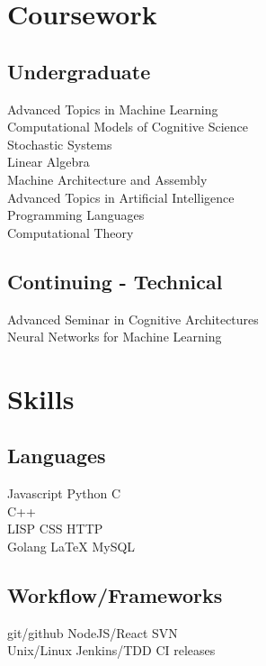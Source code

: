 \documentclass[]{csaund-resume}
\begin{document}
\begin{minipage}[t]{0.33\textwidth}
\section{Coursework}
\subsection{Undergraduate}
Advanced Topics in Machine Learning \\
Computational Models of Cognitive Science \\
Stochastic Systems \\
Linear Algebra \\
Machine Architecture and Assembly \\
Advanced Topics in Artificial Intelligence \\
Programming Languages \\
Computational Theory \\
\sectionsep

\subsection{Continuing - Technical}
Advanced Seminar in Cognitive Architectures \\
Neural Networks for Machine Learning \\


\section{Skills}
\subsection{Languages}
Javascript \textbullet{} Python \textbullet{} C \\
C++ \\
LISP \textbullet{} \textbullet{} CSS \textbullet{} HTTP \\
Golang \textbullet{} LaTeX \textbullet{} MySQL
\subsection{Workflow/Frameworks}
git/github \textbullet{} NodeJS/React \textbullet{} SVN \textbullet{} \\
 Unix/Linux \textbullet{} Jenkins/TDD \textbullet{} CI releases
\sectionsep

%
%

\end{minipage}
\end{document}
